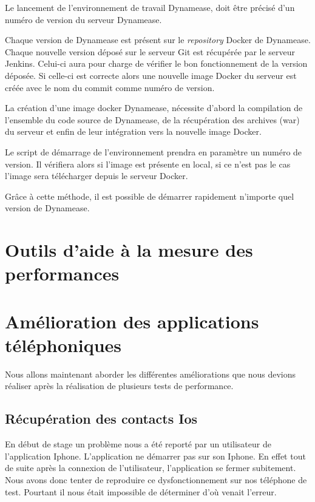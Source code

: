 Le lancement de l'environnement de travail Dynamease, doit être précisé d'un numéro de version du serveur Dynamease. 

Chaque version de Dynamease est présent sur le \textit{repository} Docker de Dynamease. Chaque nouvelle version déposé sur le serveur Git est récupérée par le serveur Jenkins. Celui-ci aura pour charge de vérifier le bon fonctionnement de la version déposée. Si celle-ci est correcte alors une nouvelle image Docker du serveur est créée avec le nom du commit comme numéro de version.

La création d'une image docker Dynamease, nécessite d'abord la compilation de l'ensemble du code source de Dynamease, de la récupération des archives (war) du serveur et enfin de leur intégration vers la nouvelle image Docker.

Le script de démarrage de l'environnement prendra en paramètre un numéro de version. Il vérifiera alors si l'image est présente en local, si ce n'est pas le cas l'image sera télécharger depuis le serveur Docker.

Grâce à cette méthode, il est possible de démarrer rapidement n'importe quel version de Dynamease.

\section{Outils d'aide à la mesure des performances}

\section{Amélioration des applications téléphoniques}

Nous allons maintenant aborder les différentes améliorations que nous devions réaliser après la réalisation de plusieurs tests de performance.

\subsection{Récupération des contacts Ios}

En début de stage un problème nous a été reporté par un utilisateur de l'application Iphone. L'application ne démarrer pas sur son Iphone. En effet tout de suite après la connexion de l'utilisateur, l'application se fermer subitement. Nous avons donc tenter de reproduire ce dysfonctionnement sur nos téléphone de test. Pourtant il nous était impossible de déterminer d'où venait l'erreur.

